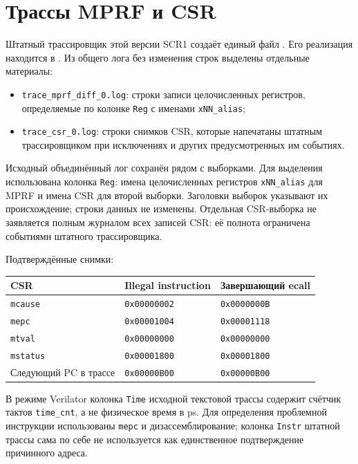 \documentclass[12pt,a4paper]{article}
\begin{document}
\section{Трассы MPRF и CSR}
Штатный трассировщик этой версии SCR1 создаёт единый файл
. Его реализация находится в
.
Из общего лога без изменения строк выделены отдельные материалы:
\begin{itemize}
\item \texttt{trace\_mprf\_diff\_0.log}: строки записи целочисленных
регистров, определяемые по колонке \texttt{Reg} с именами \texttt{xNN\_alias};
\item \texttt{trace\_csr\_0.log}: строки снимков CSR, которые напечатаны
штатным трассировщиком при исключениях и других предусмотренных им событиях.
\end{itemize}
Исходный объединённый лог сохранён рядом с выборками. Для выделения
использована колонка \texttt{Reg}: имена целочисленных регистров
\texttt{xNN\_alias} для MPRF и имена CSR для второй выборки.
Заголовки выборок указывают их происхождение; строки данных не изменены.
Отдельная CSR-выборка не заявляется полным журналом всех записей CSR:
её полнота ограничена событиями штатного трассировщика.

Подтверждённые снимки:
\begin{center}
\begin{tabular}{lll}
\toprule
CSR & Illegal instruction & Завершающий ecall \\
\midrule
\texttt{mcause} & \texttt{0x00000002} & \texttt{0x0000000B} \\
\texttt{mepc} & \texttt{0x00001004} & \texttt{0x00001118} \\
\texttt{mtval} & \texttt{0x00000000} & \texttt{0x00000000} \\
\texttt{mstatus} & \texttt{0x00001800} & \texttt{0x00001800} \\
Следующий PC в трассе & \texttt{0x00000B00} & \texttt{0x00000B00} \\
\bottomrule
\end{tabular}
\end{center}
В режиме Verilator колонка \texttt{Time} исходной текстовой трассы содержит
счётчик тактов \texttt{time\_cnt}, а не физическое время в ps.
Для определения проблемной инструкции использованы \texttt{mepc} и
дизассемблирование; колонка \texttt{Instr} штатной трассы сама по себе
не используется как единственное подтверждение причинного адреса.
\end{document}
